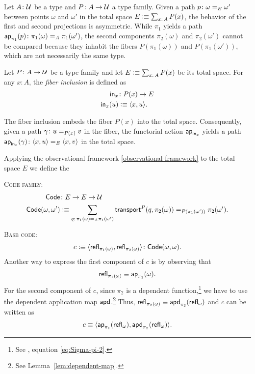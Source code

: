 Let $A\colon\univ$ be a type and $P\colon A\to\univ$ a type family. Given a path $p\colon\omega\eq E\omega'$ between points $\omega$ and $\omega'$ in the total space $E\defeq\sum_{x\colon A}P(x)$, the behavior of the first and second projections is asymmetric. While $\pi_1$ yields a path $\fun{ap}_{\pi_1}(p)\colon\pi_1(\omega)\eq A\pi_1(\omega')$, the second components $\pi_2(\omega)$ and $\pi_2(\omega')$ cannot be compared because they inhabit the fibers $P(\pi_1(\omega))$ and $P(\pi_1(\omega'))$, which are not necessarily the same type.

\begin{defn}
    Let $P\colon A\to\univ$ be a type family and let $E\defeq\sum_{x\colon A}P(x)$ be its total space.
    For any $x\colon A$, the \textsl{fiber inclusion} is defined as
    \begin{align*}
        \fun{in}_x&\colon P(x)\to E\\
        \fun{in}_x(u)&\defeq\dep{x,u}.
    \end{align*}
\end{defn}

\begin{rem}\label{rem:fiber-inclusion}
    The fiber inclusion embeds the fiber $P(x)$ into the total space. Consequently, given a path $\gamma\colon u\eq{P(x)} v$ in the fiber, the functorial action $\mathsf{ap}_{\mathsf{in}_x}$ yields a path $\fun{ap}_{\fun{in}_x}(\gamma)\colon\dep{x,u}\eq E\dep{x,v}$ in the total space.
\end{rem}

\separator

Applying the observational framework \ref{observational-framework} to the total space $E$ we define the

\textsc{Code family:}
\begin{align*}
    \fun{Code}
        &\colon E\to E\to\univ\\
    \fun{Code}(\omega,\omega')
        &\defeq\sum_{q\colon\pi_1(\omega)\eq A\pi_1(\omega')}
            \fun{transport}^P(q,\pi_2(\omega))
            \eq{P(\pi_1(\omega'))}
            \pi_2(\omega').
\end{align*}

\textsc{Base code:}
\[
    c\defeq
        \dep{
            \fun{refl}_{\pi_1(\omega)}, \fun{refl}_{\pi_2(\omega)}
        }
        \colon\fun{Code}(\omega,\omega).
\]
Another way to express the first component of $c$ is by observing that
\[
    \mathsf{refl}_{\pi_1(\omega)}\equiv\mathsf{ap}_{\pi_1}(\omega).
\]
For the second component of $c$, since $\pi_2$ is a dependent function,\footnote{See , equation \eqref{eq:Sigma-pi-2}.} we have to use the dependent application map $\mathsf{apd}$.\footnote{See Lemma~\ref{lem:dependent-map}.} Thus, $\mathsf{refl}_{\pi_2(\omega)}\equiv\mathsf{apd}_{\pi_2}(\mathsf{refl}_\omega)$ and $c$ can be written as
\[
    c\equiv
        \langle
            \mathsf{ap}_{\pi_1}(\mathsf{refl}_\omega),\mathsf{apd}_{\pi_2}(\mathsf{refl}_\omega)
        \rangle.
\]

